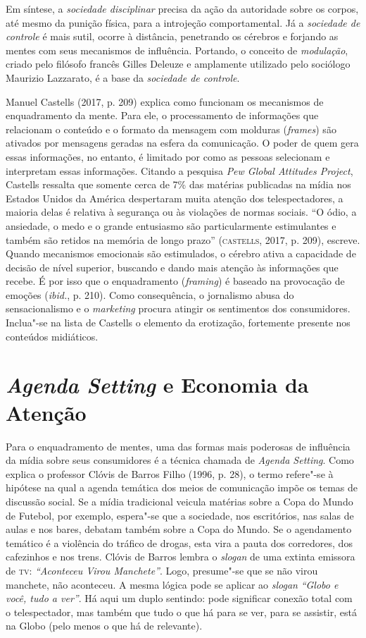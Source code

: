 Em síntese, a \emph{sociedade disciplinar} precisa da ação da autoridade
sobre os corpos, até mesmo da punição física, para a introjeção
comportamental. Já a \emph{sociedade de controle} é mais sutil, ocorre à
distância, penetrando os cérebros e forjando as mentes com seus
mecanismos de influência. Portando, o conceito de \emph{modulação},
criado pelo filósofo francês Gilles Deleuze e amplamente utilizado pelo
sociólogo Maurizio Lazzarato, é a base da \emph{sociedade de controle}.

Manuel Castells (2017, p. 209) explica como funcionam os mecanismos de
enquadramento da mente. Para ele, o processamento de informações que
relacionam o conteúdo e o formato da mensagem com molduras
(\emph{frames}) são ativados por mensagens geradas na esfera da
comunicação. O poder de quem gera essas informações, no entanto, é
limitado por como as pessoas selecionam e interpretam essas informações.
Citando a pesquisa \emph{Pew Global Attitudes Project}, Castells
ressalta que somente cerca de 7\% das matérias publicadas na mídia nos
Estados Unidos da América despertaram muita atenção dos telespectadores,
a maioria delas é relativa à segurança ou às violações de normas
sociais. ``O ódio, a ansiedade, o medo e o grande entusiasmo são
particularmente estimulantes e também são retidos na memória de longo
prazo'' (\textsc{castells}, 2017, p. 209), escreve. Quando mecanismos emocionais
são estimulados, o cérebro ativa a capacidade de decisão de nível
superior, buscando e dando mais atenção às informações que recebe. É por
isso que o enquadramento (\emph{framing}) é baseado na provocação de
emoções (\emph{ibid.}, p. 210). Como consequência, o jornalismo abusa do
sensacionalismo e o \emph{marketing} procura atingir os sentimentos dos
consumidores. Inclua"-se na lista de Castells o elemento da erotização,
fortemente presente nos conteúdos midiáticos.

\section{\emph{Agenda Setting} e Economia da Atenção}

\noindent{}Para o enquadramento de mentes, uma das formas mais poderosas de
influência da mídia sobre seus consumidores é a técnica chamada de
\emph{Agenda Setting}. Como explica o professor Clóvis de Barros Filho
(1996, p. 28), o termo refere"-se à hipótese na qual a agenda temática
dos meios de comunicação impõe os temas de discussão social. Se a mídia
tradicional veicula matérias sobre a Copa do Mundo de Futebol, por
exemplo, espera"-se que a sociedade, nos escritórios, nas salas de aulas
e nos bares, debatam também sobre a Copa do Mundo. Se o agendamento
temático é a violência do tráfico de drogas, esta vira a pauta dos
corredores, dos cafezinhos e nos trens. Clóvis de Barros lembra o
\emph{slogan} de uma extinta emissora de \textsc{tv}: \emph{``Aconteceu Virou
Manchete''}. Logo, presume"-se que se não virou manchete, não aconteceu.
A mesma lógica pode se aplicar ao \emph{slogan} \emph{``Globo e você,
tudo a ver''}. Há aqui um duplo sentindo: pode significar conexão total
com o telespectador, mas também que tudo o que há para se ver, para se
assistir, está na Globo (pelo menos o que há de relevante).


